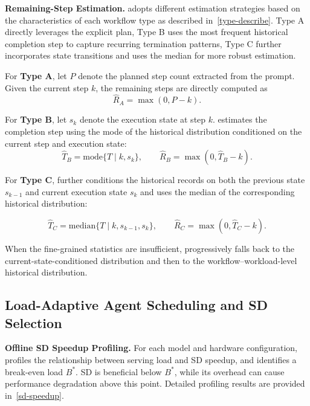 \textbf{Remaining-Step Estimation.}
\sysname adopts different estimation strategies based on the characteristics of each workflow type as described in~\autoref{type-describe}.
Type A directly leverages the explicit plan, Type B uses the most frequent historical completion step to capture recurring termination patterns, Type C further incorporates state transitions and uses the median for more robust estimation.

For \textbf{Type A}, let $P$ denote the planned step count extracted from the prompt. 
Given the current step $k$, the remaining steps are directly computed as
\begin{equation}
\hat{R}_{A} = \max(0, P-k).
\end{equation}

For \textbf{Type B}, let $s_k$ denote the execution state at step $k$. 
\sysname estimates the completion step using the mode of the historical distribution conditioned on the current step and execution state:
\begin{equation}
\hat{T}_{B} =
\mathrm{mode}\{T \mid k, s_k\},
\qquad
\hat{R}_{B} = \max(0, \hat{T}_{B}-k).
\end{equation}

For \textbf{Type C}, \sysname further conditions the historical records on both the previous state $s_{k-1}$ and current execution state $s_k$ and uses the median of the corresponding historical distribution:

\begin{equation}
\hat{T}_{C} =
\mathrm{median}\{T \mid k, s_{k-1}, s_k\},
\qquad
\hat{R}_{C} = \max(0, \hat{T}_{C}-k).
\end{equation}

When the fine-grained statistics are insufficient, \sysname progressively falls back to the current-state-conditioned distribution and then to the workflow--workload-level historical distribution.


\subsection{Load-Adaptive Agent Scheduling and SD Selection}
\label{sec:4.3}

\textbf{Offline SD Speedup Profiling.}
\label{sec:4.3.1}
For each model and hardware configuration, \sysname profiles the relationship between serving load and SD speedup, and identifies a break-even load $B^{*}$.
SD is beneficial below $B^{*}$, while its overhead can cause performance degradation above this point. Detailed profiling results are provided in~\autoref{sd-speedup}.

